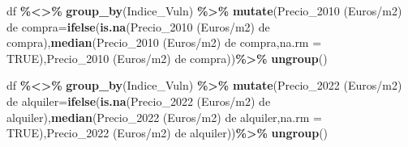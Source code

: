 \documentclass[notspecified,article,submit,moreauthors,pdftex]{Definitions/mdpi}
\newenvironment{Shaded}{\begin{snugshade}}{\end{snugshade}}
\newcommand{\AttributeTok}[1]{\textcolor[rgb]{0.13,0.29,0.53}{#1}}
\newcommand{\ConstantTok}[1]{\textcolor[rgb]{0.56,0.35,0.01}{#1}}
\newcommand{\FunctionTok}[1]{\textcolor[rgb]{0.13,0.29,0.53}{\textbf{#1}}}
\newcommand{\NormalTok}[1]{#1}
\newcommand{\OtherTok}[1]{\textcolor[rgb]{0.56,0.35,0.01}{#1}}
\newcommand{\SpecialCharTok}[1]{\textcolor[rgb]{0.81,0.36,0.00}{\textbf{#1}}}
\newcommand{\StringTok}[1]{\textcolor[rgb]{0.31,0.60,0.02}{#1}}
\begin{document}
\begin{Shaded}
\begin{Highlighting}[]
\NormalTok{df }\SpecialCharTok{\%\textless{}\textgreater{}\%}
  \FunctionTok{group\_by}\NormalTok{(}\StringTok{\textasciigrave{}}\AttributeTok{Indice\_Vuln}\StringTok{\textasciigrave{}}\NormalTok{) }\SpecialCharTok{\%\textgreater{}\%} 
  \FunctionTok{mutate}\NormalTok{(}\StringTok{\textasciigrave{}}\AttributeTok{Precio\_2010 (Euros/m2) de compra}\StringTok{\textasciigrave{}}\OtherTok{=}\FunctionTok{ifelse}\NormalTok{(}\FunctionTok{is.na}\NormalTok{(}\StringTok{\textasciigrave{}}\AttributeTok{Precio\_2010 (Euros/m2) de compra}\StringTok{\textasciigrave{}}\NormalTok{),}\FunctionTok{median}\NormalTok{(}\StringTok{\textasciigrave{}}\AttributeTok{Precio\_2010 (Euros/m2) de compra}\StringTok{\textasciigrave{}}\NormalTok{,}\AttributeTok{na.rm =} \ConstantTok{TRUE}\NormalTok{),}\StringTok{\textasciigrave{}}\AttributeTok{Precio\_2010 (Euros/m2) de compra}\StringTok{\textasciigrave{}}\NormalTok{))}\SpecialCharTok{\%\textgreater{}\%}
  \FunctionTok{ungroup}\NormalTok{() }
\end{Highlighting}
\end{Shaded}

\begin{Shaded}
\begin{Highlighting}[]
\NormalTok{df }\SpecialCharTok{\%\textless{}\textgreater{}\%}
  \FunctionTok{group\_by}\NormalTok{(}\StringTok{\textasciigrave{}}\AttributeTok{Indice\_Vuln}\StringTok{\textasciigrave{}}\NormalTok{) }\SpecialCharTok{\%\textgreater{}\%} 
  \FunctionTok{mutate}\NormalTok{(}\StringTok{\textasciigrave{}}\AttributeTok{Precio\_2022 (Euros/m2) de alquiler}\StringTok{\textasciigrave{}}\OtherTok{=}\FunctionTok{ifelse}\NormalTok{(}\FunctionTok{is.na}\NormalTok{(}\StringTok{\textasciigrave{}}\AttributeTok{Precio\_2022 (Euros/m2) de alquiler}\StringTok{\textasciigrave{}}\NormalTok{),}\FunctionTok{median}\NormalTok{(}\StringTok{\textasciigrave{}}\AttributeTok{Precio\_2022 (Euros/m2) de alquiler}\StringTok{\textasciigrave{}}\NormalTok{,}\AttributeTok{na.rm =} \ConstantTok{TRUE}\NormalTok{),}\StringTok{\textasciigrave{}}\AttributeTok{Precio\_2022 (Euros/m2) de alquiler}\StringTok{\textasciigrave{}}\NormalTok{))}\SpecialCharTok{\%\textgreater{}\%}
  \FunctionTok{ungroup}\NormalTok{() }
\end{Highlighting}
\end{Shaded}
\end{document}
